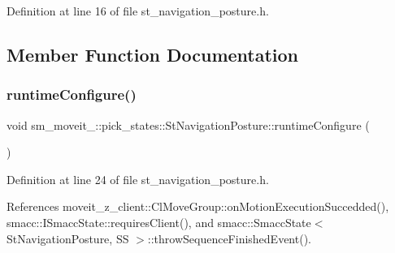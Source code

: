 Definition at line 16 of file st\+\_\+navigation\+\_\+posture.\+h.



\subsection{Member Function Documentation}
\mbox{\label{structsm__moveit__4_1_1pick__states_1_1StNavigationPosture_a224f91484ed745b360dd97c0fef63567}} 
\subsubsection{\texorpdfstring{runtime\+Configure()}{runtimeConfigure()}}
{\footnotesize\ttfamily void sm\+\_\+moveit\+\_\+::pick\+\_\+states\+::\+St\+Navigation\+Posture\+::runtime\+Configure (\begin{DoxyParamCaption}{ }\end{DoxyParamCaption})\hspace{0.3cm}{\ttfamily [inline]}}



Definition at line 24 of file st\+\_\+navigation\+\_\+posture.\+h.



References moveit\+\_\+z\+\_\+client\+::\+Cl\+Move\+Group\+::on\+Motion\+Execution\+Succedded(), smacc\+::\+I\+Smacc\+State\+::requires\+Client(), and smacc\+::\+Smacc\+State$<$ St\+Navigation\+Posture, S\+S $>$\+::throw\+Sequence\+Finished\+Event().


